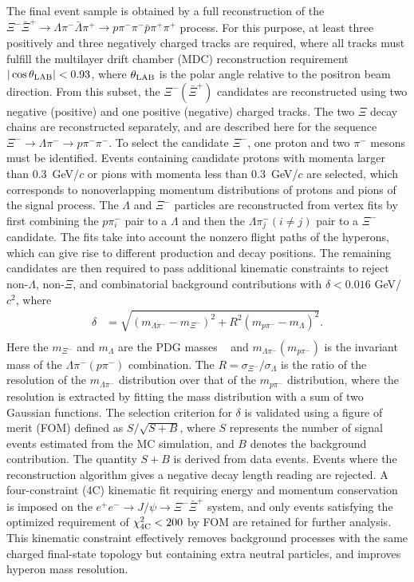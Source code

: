 \documentclass[aps,amsmath,amssymb,reprint]{revtex4-2}
\newcommand{\xim}{\Xi^{-}}
\newcommand{\xip}{\bar{\Xi}^{+}}
\newcommand{\lambar}{\bar{\Lambda}}
\newcommand{\XXb}{\Xi^{-}\bar{\Xi}^{+}}
\newcommand{\jpsi}{J/\psi}
\newcommand{\chifc}{\chi^2_{\rm 4C}}
\newcommand{\EE}{e^+e^-}
\begin{document}
The final event sample is obtained by a full reconstruction of the $\XXb\to\Lambda\pi^{-}\lambar\pi^{+}\to p\pi^{-}\pi^{-}\bar{p}\pi^{+}\pi^{+}$ process.
For this purpose, at least three positively and three negatively charged tracks are required, where all tracks must fulfill the multilayer drift chamber (MDC) reconstruction requirement $|\cos\theta_{\rm LAB}| < 0.93$, where $\theta_{\rm LAB}$ is the polar angle relative to the positron beam direction.
From this subset, the $\xim(\xip)$ candidates are reconstructed using two negative (positive) and one positive (negative) charged tracks.
The two $\Xi$ decay chains are reconstructed separately, and are described here for the sequence $\xim\to\Lambda\pi^-\to p\pi^-\pi^-$.
To select the candidate $\xim$, one proton and two $\pi^-$ mesons must be identified.
Events containing candidate protons with momenta larger than 0.3~GeV/$c$ or pions with momenta less than 0.3~GeV/$c$ are selected, which corresponds to nonoverlapping momentum distributions of protons and pions of the signal process.
The $\Lambda$ and $\xim$ particles are reconstructed from vertex fits by first combining the $p\pi^-_i$ pair to a $\Lambda$ and then the $\Lambda\pi^-_j(i\neq j)$ pair to a $\Xi^-$ candidate. The fits take into account the nonzero flight paths of the hyperons, which can give rise to different production and decay positions.
The remaining candidates are then required to pass additional kinematic constraints to reject non-$\Lambda$, non-$\Xi$, and combinatorial background contributions with $\delta<0.016$ GeV/$c^2$, where
\begin{equation}
\begin{array}{cc}
    \label{eq:delta}
    \delta &= \sqrt{(m_{\Lambda\pi^-} - m_{\Xi^-})^2 + {R}^2(m_{p\pi^-} - m_{\Lambda})^2}. \\
    \end{array}
\end{equation}
\noindent Here the $m_{\xim}$ and $m_\Lambda$ are the PDG masses ~\cite{ParticleDataGroup:2024cfk} and $m_{\Lambda\pi^-}(m_{p\pi^-})$ is the invariant mass of the $\Lambda\pi^-(p\pi^-)$ combination.
The
$R = \sigma_{\Xi^-}/\sigma_{\Lambda}$ is the ratio of the resolution of the $m_{\Lambda\pi^-}$ distribution over that of the $m_{p\pi^-}$ distribution, where the resolution is extracted by fitting the mass distribution with a sum of two Gaussian functions.
The selection criterion for $\delta$ is validated using a figure of merit (FOM) defined as $S/\sqrt{S+B}$, where $S$ represents the number of signal events estimated from the MC simulation, and $B$ denotes the background contribution. The quantity $S+B$ is derived from data events.
Events where the reconstruction algorithm gives a negative decay length reading are rejected.
A four-constraint (4C) kinematic fit requiring energy and momentum conservation is imposed on the $\EE\to\jpsi\to\XXb$ system, and only events satisfying the optimized requirement of $\chifc<200$ by FOM are retained for further analysis. This kinematic constraint effectively removes background processes with the same charged final-state topology but containing extra neutral particles, and improves hyperon mass resolution.
\end{document}
